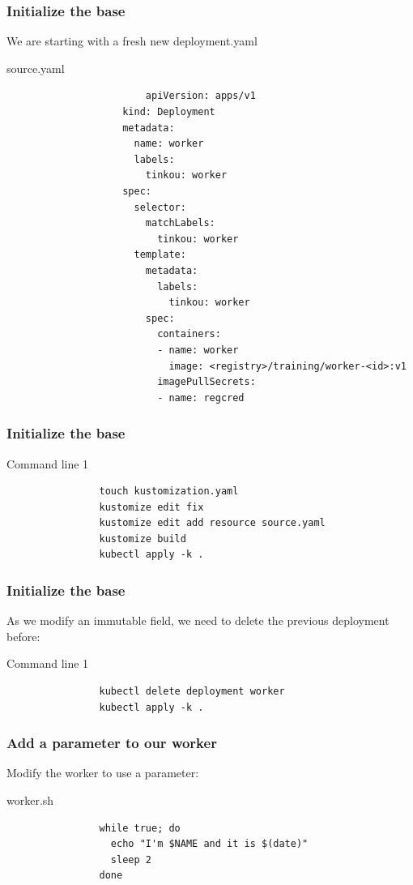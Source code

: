 	\begin{frame}[fragile]
		\frametitle{Initialize the base}
		
		We are starting with a fresh new deployment.yaml
		\begin{block}{source.yaml}
			\begin{tiny}
				\begin{verbatim}
						apiVersion: apps/v1
					kind: Deployment
					metadata:
					  name: worker
					  labels:
					    tinkou: worker
					spec:
					  selector:
					    matchLabels:
					      tinkou: worker
					  template:
					    metadata:
					      labels:
					        tinkou: worker
					    spec:
					      containers:
					      - name: worker
					        image: <registry>/training/worker-<id>:v1
					      imagePullSecrets:
					      - name: regcred
				\end{verbatim}
			\end{tiny}
		\end{block}
	\end{frame}
	
	\begin{frame}[fragile]
		\frametitle{Initialize the base}
		\begin{block}{Command line 1}
			\begin{verbatim}
				touch kustomization.yaml
				kustomize edit fix
				kustomize edit add resource source.yaml
				kustomize build
				kubectl apply -k .
			\end{verbatim}
		\end{block}
	\end{frame}
	
	\begin{frame}[fragile]
		\frametitle{Initialize the base}
		As we modify an immutable field, we need to delete the previous deployment before:
		\begin{block}{Command line 1}
			\begin{verbatim}
				kubectl delete deployment worker
				kubectl apply -k .
			\end{verbatim}
		\end{block}
	\end{frame}
	
	\begin{frame}[fragile]
		\frametitle{Add a parameter to our worker}
		
		Modify the worker to use a parameter:
		\begin{block}{worker.sh}
			\begin{verbatim}
				while true; do
				  echo "I'm $NAME and it is $(date)"
				  sleep 2
				done
			\end{verbatim}
		\end{block}
	\end{frame}
	
